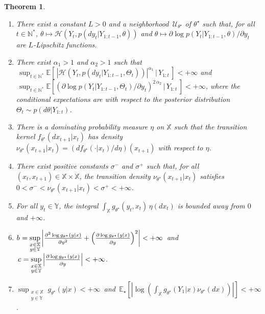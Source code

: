 \documentclass[12pt]{article}
\theoremstyle{plain}
\newtheorem{theorem}{Theorem}
\theoremstyle{definition}
\begin{document}
\begin{theorem}
\begin{enumerate}[label=(\alph*)]
			\item\label{cond:2h} There exist a constant $L>0$ and a neighborhood $\,\mathcal{U}_{\theta^\star}$ of $\theta^\star$ such that, for all $t\in\mathbb{N}^*$, $\theta\mapsto\mathcal{H}\left(Y_t,p(dy_t|Y_{1:t-1},\theta)\right)$  and $\theta\mapsto \partial \log p(Y_t|Y_{1:t-1},\theta)/\partial y_t$ are $L$-Lipschitz functions.
			\item\label{cond:2i} There exist $\alpha_1>1$ and $\alpha_2>1$ such that $\,\sup_{t\in\mathbb{N}^*}\mathbb{E}\left[\,|\mathcal{H}\left(Y_t,p(dy_t|Y_{1:t-1},\Theta_t)\right)|^{\alpha_1}\,|\,Y_{1:t}\,\right]< +\infty$ and $\,\sup_{t\in\mathbb{N}^*}\mathbb{E}\left[\left(\partial \log p(Y_t|Y_{1:t-1},\Theta_t)/\partial y_t\right)^{2\,\alpha_2}\,|\,Y_{1:t}\,\right]< +\infty$, where the conditional expectations are with respect to the posterior distribution $\Theta_t\sim p(d\theta|Y_{1:t})$.
			\item\label{cond:2j} There is a dominating probability measure $\eta$ on $\mathbb{X}$ such that the transition kernel $f_{\theta^\star}(dx_{t+1}|x_{t})$ has density $\nu_{\theta^\star}(x_{t+1}|x_t)=(df_{\theta^\star}(\cdot|x_{t})/d\eta)(x_{t+1})$ with respect to $\eta$.
			\item\label{cond:2k} There exist positive constants $\sigma^-$ and $\sigma^+$ such that, for all $(x_t,x_{t+1})\in\mathbb{X}\times\mathbb{X}$, the transition density $\nu_{\theta^\star}(x_{t+1}|x_t)$ satisfies $0<\sigma^-<\nu_{\theta^\star}(x_{t+1}|x_t)<\sigma^+<+\infty$.
			\item\label{cond:2l} For all $y_t\in\mathbb{Y}$, the integral $\int_\mathbb{X}g_{\theta^\star}(y_t,x_t)\,\eta(dx_t)$ is bounded away from $0$ and $+\infty$.
			\item\label{cond:2m} ${b_{}}= \sup_{\substack{x\in\mathbb{X}\\y\in\mathbb{Y}}}\limits \left|\frac{\partial^2\log g_{\theta^\star}(y|x)}{\partial y^{2^{\vphantom{S}}}} + \left(\frac{\partial\log g_{\theta^\star}(y|x)}{\partial y^{\vphantom{\mathcal{S}^S}}}\right)^2\right|<+\infty\,$ and $\,{c_{}} = \sup_{\substack{x\in\mathbb{X}\\y\in\mathbb{Y}}}\limits \left|\frac{\partial\log g_{\theta^\star}(y|x)}{\partial y^{\vphantom{\mathcal{S}^S}}}\right| < +\infty$.
			\item\label{cond:2n} $\sup_{\substack{x\in\mathbb{X}\\y\in\mathbb{Y}}}\limits g_{\theta^\star}(y|x)<+\infty\,$ and $\,\mathbb{E}_\star\left[\left|\log\left(\int_\mathbb{X}g_{\theta^\star}(Y_1|x)\nu_{\theta^\star}(dx)\right)\right|\right] <+\infty$.

\end{enumerate}
\end{theorem}
\end{document}
